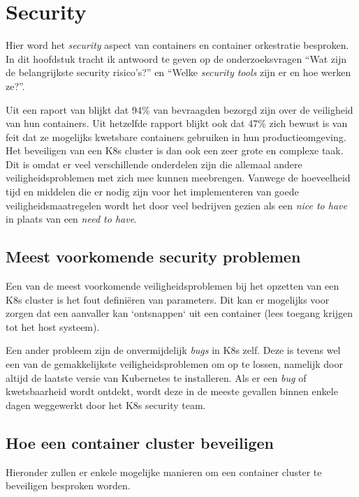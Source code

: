 \section{Security}

Hier word het \textit{security} aspect van containers en container orkestratie besproken. In dit hoofdstuk tracht ik antwoord te geven op de onderzoeksvragen ``Wat zijn de belangrijkste security risico's?'' en ``Welke \textit{security tools} zijn er en hoe werken ze?''.

Uit een raport van \autocite{Tripwire2019} blijkt dat 94\% van bevraagden bezorgd zijn over de veiligheid van hun containers. Uit hetzelfde rapport blijkt ook dat 47\% zich bewust is van feit dat ze mogelijks kwetsbare containers gebruiken in hun productieomgeving. Het beveiligen van een K8s cluster is dan ook een zeer grote en complexe taak. Dit is omdat er veel verschillende onderdelen zijn die allemaal andere veiligheidsproblemen met zich mee kunnen meebrengen. Vanwege de hoeveelheid tijd en middelen die er nodig zijn voor het implementeren van goede veiligheidsmaatregelen wordt het door veel bedrijven gezien als een \textit{nice to have} in plaats van een \textit{need to have}.

\subsection{Meest voorkomende security problemen}
Een van de meest voorkomende veiligheidsproblemen bij het opzetten van een K8s cluster is het fout definiëren van parameters. Dit kan er mogelijks voor zorgen dat een aanvaller kan `ontsnappen` uit een container (lees toegang krijgen tot het host systeem).

Een ander probleem zijn de onvermijdelijk \textit{bugs} in K8s zelf. Deze is tevens wel een van de gemakkelijkste veiligheidsproblemen om op te lossen, namelijk door altijd de laatste versie van Kubernetes te installeren. Als er een \textit{bug} of kwetsbaarheid wordt ontdekt, wordt deze in de meeste gevallen binnen enkele dagen weggewerkt door het K8s security team.

\subsection{Hoe een container cluster beveiligen}
Hieronder zullen er enkele mogelijke manieren om een container cluster te beveiligen besproken worden.

